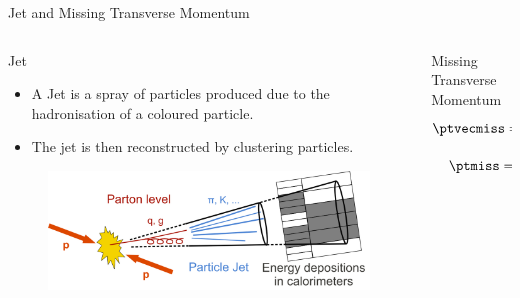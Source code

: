 \begin{frame}[fragile]{Jet and Missing Transverse Momentum}
  \begin{columns}
    \begin{column}{0.5\textwidth}
      \begin{exampleblock}{Jet}
        \begin{itemize}
          \item A Jet is a spray of particles produced due to the hadronisation of a coloured particle.
          \item The jet is then reconstructed by clustering particles.
        \end{itemize} 
      \end{exampleblock}

      \begin{figure}[htpb]
        \centering
        \includegraphics[width=1.0\textwidth]{fig/Sketch_PartonParticleCaloJet.png}
      \end{figure}
    \end{column}

    \vrule{}

    \begin{column}{0.5\textwidth}
      \begin{exampleblock}{Missing Transverse Momentum}
         \begin{gather*}
          \ptvecmiss = -\sum_{i \in \textrm{particles}} \ptvec(i) \\
          \ptmiss = \abs{\ptvecmiss}
        \end{gather*}       
      \end{exampleblock}
    \end{column}
  \end{columns}
\end{frame}


